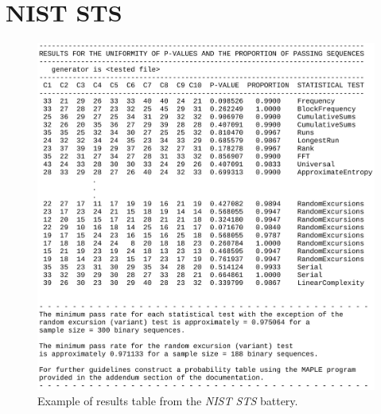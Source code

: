 \documentclass[
  digital,     %
  oneside,     %
  nosansbold,  %
  nocolorbold, %
  nolof,         %
  nolot,         %
]{fithesis4}
\begin{document}
\newpage

\section{NIST STS} \label{append:nist-output}

\begin{figure}[h]
  \begin{center}
    \includegraphics[width=12.5cm]{figures/outputs-appendix/finalAnalysisReport.jpg}
  \end{center}
  \caption{Example of results table from the \emph{NIST STS} battery.}
  \label{fig:nist_tab}
\end{figure}

\newpage
\end{document}
